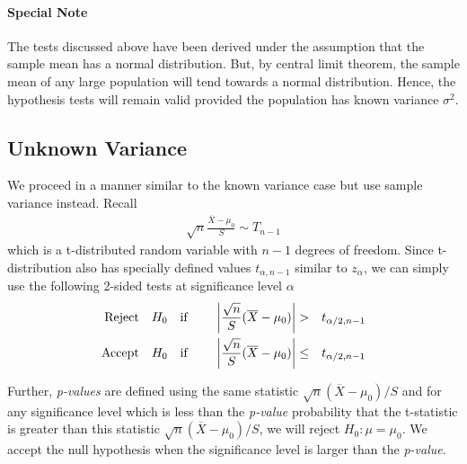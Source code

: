 \documentclass[../probability-notes.tex]{subfiles}
\begin{document}
    \paragraph{Special Note} The tests discussed above have been derived under the assumption that the sample mean has a normal distribution. But, by central limit theorem, the sample mean of any large population will tend towards a normal distribution. Hence, the hypothesis tests will remain valid provided the population has known variance $\sigma^{2}$.

    \subsection{Unknown Variance}\label{mean_normal_unknown_variance}
    We proceed in a manner similar to the known variance case but use sample variance instead. Recall
    \begin{align*}
        \sqrt{n} \frac{\overline{X} - \mu_{0}}{S} \sim T_{n-1}
    \end{align*}
    which is a t-distributed random variable with $n-1$ degrees of freedom. Since t-distribution also has specially defined values $t_{\alpha, n-1}$ similar to $z_{\alpha}$, we can simply use the following 2-sided tests at significance level $\alpha$
    \begin{alignat*}{4}
        \text{Reject\quad} &H_{0} \text{\quad if \quad} &\bigg \lvert\frac{\sqrt{n}}{S}(\overline{X} - \mu_{0}) \bigg\rvert &> &t_{\alpha/2, n-1}\\
        \text{Accept\quad} &H_{0} \text{\quad if\quad} &\bigg \lvert\frac{\sqrt{n}}{S}(\overline{X} - \mu_{0}) \bigg\rvert &\leq &t_{\alpha/2, n-1}\\
    \end{alignat*}

    Further, \emph{p-values} are defined using the same statistic $\sqrt{n}(\overline{X} - \mu_{0})/S$ and for any significance level which is less than the \emph{p-value} probability that the t-statistic is greater than this statistic $\sqrt{n}(\overline{X} - \mu_{0})/S$, we will reject $H_{0}: \mu = \mu_{0}$. We accept the null hypothesis when the significance level is larger than the \emph{p-value}.\newline
\end{document}
